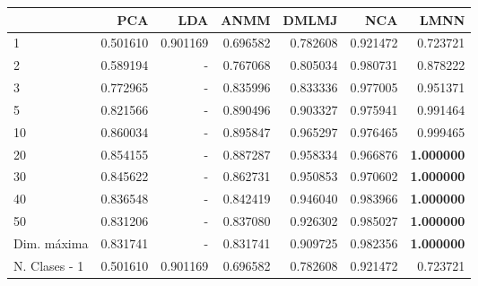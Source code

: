 \begin{tabular}{lrrrrrr}
\toprule
{} &       PCA &       LDA &      ANMM &     DMLMJ &       NCA &      LMNN \\
\midrule
1             &  0.501610 &  0.901169 &  0.696582 &  0.782608 &  0.921472 &  0.723721 \\
2             &  0.589194 &  -        &  0.767068 &  0.805034 &  0.980731 &  0.878222 \\
3             &  0.772965 &  -        &  0.835996 &  0.833336 &  0.977005 &  0.951371 \\
5             &  0.821566 &  -        &  0.890496 &  0.903327 &  0.975941 &  0.991464 \\
10            &  0.860034 &  -        &  0.895847 &  0.965297 &  0.976465 &  0.999465 \\
20            &  0.854155 &  -        &  0.887287 &  0.958334 &  0.966876 &  \textbf{1.000000} \\
30            &  0.845622 &  -        &  0.862731 &  0.950853 &  0.970602 &  \textbf{1.000000} \\
40            &  0.836548 &  -        &  0.842419 &  0.946040 &  0.983966 &  \textbf{1.000000} \\
50            &  0.831206 &  -        &  0.837080 &  0.926302 &  0.985027 &  \textbf{1.000000} \\
Dim. máxima   &  0.831741 &  -        &  0.831741 &  0.909725 &  0.982356 &  \textbf{1.000000} \\
N. Clases - 1 &  0.501610 &  0.901169 &  0.696582 &  0.782608 &  0.921472 &  0.723721 \\
\bottomrule
\end{tabular}
